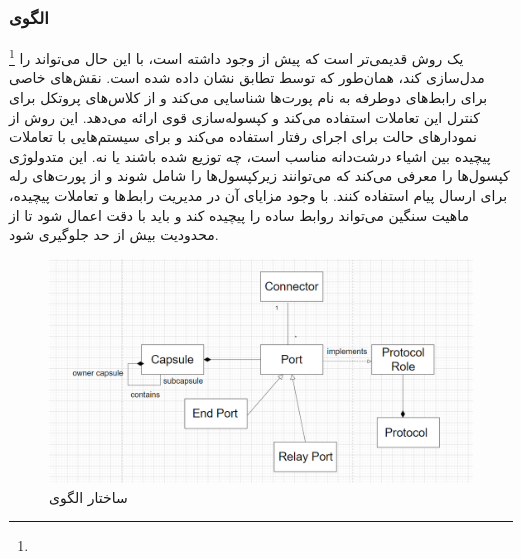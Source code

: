 \subsubsection{الگوی }
\label{archROOMSec}
\begin{RTL}
 \footnote{}
\cite{ref4} یک روش قدیمی‌تر است که پیش از  وجود داشته است، با این حال
 می‌تواند  را مدل‌سازی کند، همان‌طور که توسط تطابق
 نشان داده شده است.
 نقش‌های خاصی برای رابط‌های دوطرفه به نام پورت‌ها شناسایی می‌کند
و از کلاس‌های پروتکل برای کنترل این تعاملات استفاده می‌کند و کپسوله‌سازی قوی ارائه می‌دهد.
این روش از نمودارهای حالت برای اجرای رفتار استفاده می‌کند و برای سیستم‌هایی
با تعاملات پیچیده بین اشیاء درشت‌دانه مناسب است، چه توزیع شده
باشند یا نه. این متدولوژی کپسول‌ها را معرفی می‌کند که می‌توانند زیرکپسول‌ها را شامل شوند
و از پورت‌های رله برای ارسال پیام استفاده کنند. با وجود مزایای آن در مدیریت
رابط‌ها و تعاملات پیچیده، ماهیت سنگین  می‌تواند روابط ساده را
پیچیده کند و باید با دقت اعمال شود تا از محدودیت بیش از حد جلوگیری شود.
\end{RTL}
\begin{figure}[h!]
\centering
\includegraphics[scale=0.5]{images/first/room.png}
\caption{ساختار الگوی }
\end{figure}